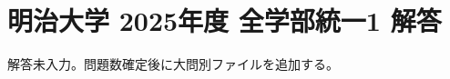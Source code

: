 \documentclass[../../uem_mat_mei_a.tex]{subfiles}
\begin{document}
    \section{明治大学 2025年度 全学部統一1 解答}

    解答未入力。問題数確定後に大問別ファイルを追加する。
\end{document}
